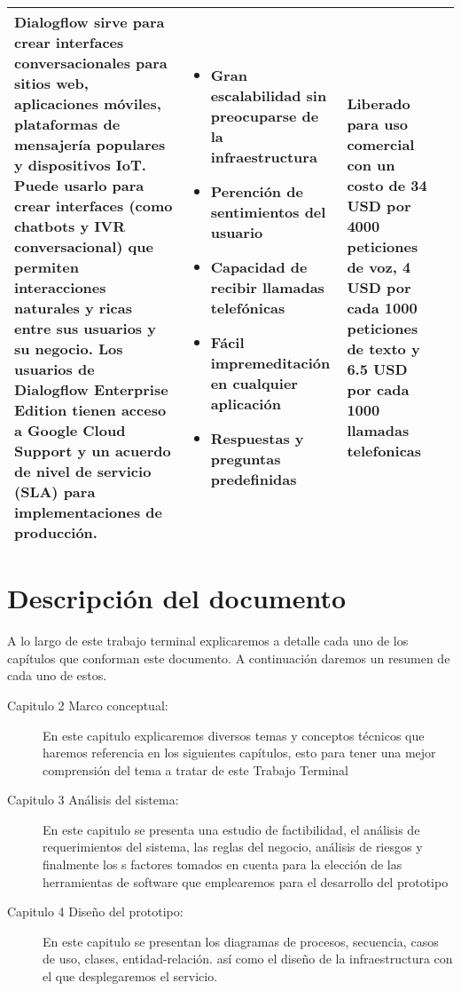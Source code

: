 \begin{longtable}[c]{| >{\centering\arraybackslash}m{2cm} | >{\centering\arraybackslash}m{6cm} | >{\centering\arraybackslash}m{4cm} | >{\centering\arraybackslash}m{3cm} |}
            Dialogflow sirve para crear interfaces conversacionales para sitios web, aplicaciones móviles, plataformas de mensajería populares y dispositivos IoT. Puede usarlo para crear interfaces (como chatbots y IVR conversacional) que permiten interacciones naturales y ricas entre sus usuarios y su negocio. Los usuarios de Dialogflow Enterprise Edition tienen acceso a Google Cloud Support y un acuerdo de nivel de servicio (SLA) para implementaciones de producción. &
            \begin{itemize}[leftmargin=*]
                \item Gran escalabilidad sin preocuparse de la infraestructura
                \item Perención de sentimientos del usuario
                \item Capacidad de recibir llamadas telefónicas
                \item Fácil impremeditación en cualquier aplicación
                \item Respuestas y preguntas predefinidas
            \end{itemize} &
            Liberado para uso comercial con un costo de 34 USD por 4000 peticiones de voz, 4 USD por cada 1000 peticiones de texto y 6.5 USD por cada 1000 llamadas telefonicas\\ \hline
        
        \end{longtable}

\section{Descripción del documento}

    A lo largo de este trabajo terminal explicaremos a detalle cada uno de los capítulos que conforman este documento. A continuación daremos un resumen de cada uno de estos.

    \begin{description}
        \item[Capitulo 2 Marco conceptual:] En este capitulo explicaremos diversos temas y conceptos técnicos que haremos referencia en los siguientes capítulos, esto para tener una mejor comprensión del tema a tratar de este Trabajo Terminal
        \item[Capitulo 3 Análisis del sistema:] En este capitulo se presenta una estudio de factibilidad, el análisis de requerimientos del sistema, las reglas del negocio, análisis de riesgos y finalmente los s factores tomados en cuenta para la elección de las herramientas de software que emplearemos para el desarrollo del prototipo
        \item[Capitulo 4 Diseño del prototipo:] En este capitulo se presentan los diagramas de procesos, secuencia, casos de uso, clases, entidad-relación. así como el diseño de la infraestructura con el que desplegaremos el servicio. 
    \end{description}



 
 